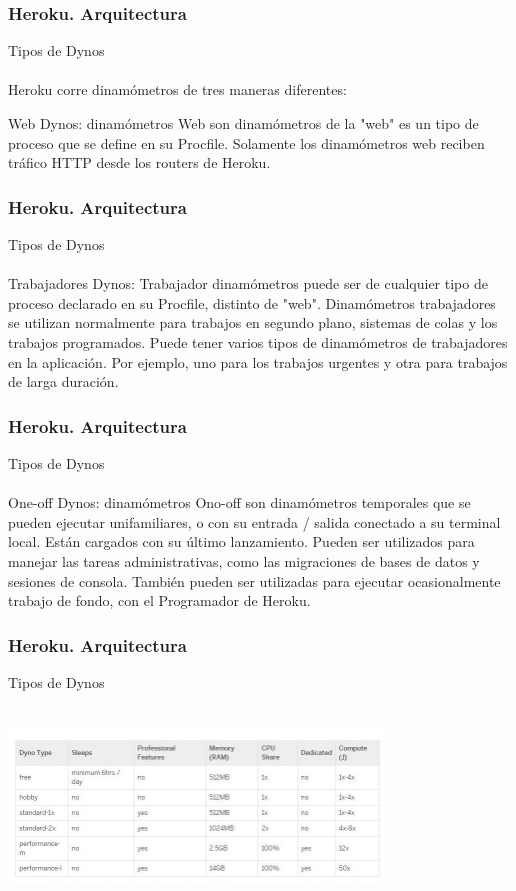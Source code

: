 \documentclass{beamer}
\begin{document}
\begin{frame}
	\frametitle{Heroku. Arquitectura}
	Tipos de Dynos\\ \ \\
Heroku corre dinamómetros de tres maneras diferentes: 

Web Dynos: dinamómetros Web son dinamómetros de la "web" es un tipo de proceso que se define en su Procfile. Solamente los dinamómetros web reciben tráfico HTTP desde los routers de Heroku. 

\end{frame}
\begin{frame}
	\frametitle{Heroku. Arquitectura}
	Tipos de Dynos\\ \ \\
Trabajadores Dynos: Trabajador dinamómetros puede ser de cualquier tipo de proceso declarado en su Procfile, distinto de "web". Dinamómetros trabajadores se utilizan normalmente para trabajos en segundo plano, sistemas de colas y los trabajos programados. Puede tener varios tipos de dinamómetros de trabajadores en la aplicación. Por ejemplo, uno para los trabajos urgentes y otra para trabajos de larga duración. 
	
\end{frame}
\begin{frame}
	\frametitle{Heroku. Arquitectura}
	Tipos de Dynos\\ \ \\
One-off Dynos: dinamómetros Ono-off son dinamómetros temporales que se pueden ejecutar unifamiliares, o con su entrada / salida conectado a su terminal local. Están cargados con su último lanzamiento. Pueden ser utilizados para manejar las tareas administrativas, como las migraciones de bases de datos y sesiones de consola. También pueden ser utilizadas para ejecutar ocasionalmente trabajo de fondo, con el Programador de Heroku.  
	
\end{frame}
\begin{frame}
	\frametitle{Heroku. Arquitectura}
	Tipos de Dynos\\ \ \\
	  \includegraphics[width=10cm,height=5cm]{arquitectura/dynos.jpg}
	
\end{frame}
\end{document}
